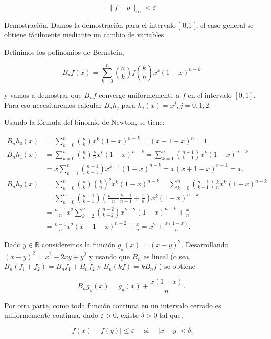 \documentclass[10pt]{book}
\begin{document}
$$
\|f-p\|_{\infty}<\varepsilon
$$

Demostración. Damos la demostración para el intervalo [ 0,1 ], el caso general se obtiene fácilmente mediante un cambio de variables.

Definimos los polinomios de Bernstein,

$$
B_{n} f(x)=\sum_{k=0}^{n}\binom{n}{k} f\left(\frac{k}{n}\right) x^{k}(1-x)^{n-k}
$$

y vamos a demostrar que $B_{n} f$ converge uniformemente a $f$ en el intervalo $[0,1]$. Para eso necesitaremos calcular $B_{n} h_{j}$ para $h_{j}(x)=x^{j}, j=0,1,2$.

Usando la fórmula del binomio de Newton, se tiene:

$$
\begin{aligned}
B_{n} h_{0}(x) & =\sum_{k=0}^{n}\binom{n}{k} x^{k}(1-x)^{n-k}=(x+1-x)^{n}=1 . \\
B_{n} h_{1}(x) & =\sum_{k=0}^{n}\binom{n}{k} \frac{k}{n} x^{k}(1-x)^{n-k}=\sum_{k=1}^{n}\binom{n-1}{k-1} x^{k}(1-x)^{n-k} \\
& =x \sum_{k=1}^{n}\binom{n-1}{k-1} x^{k-1}(1-x)^{n-k}=x(x+1-x)^{n-1}=x . \\
B_{n} h_{2}(x) & =\sum_{k=0}^{n}\binom{n}{k}\left(\frac{k}{n}\right)^{2} x^{k}(1-x)^{n-k}=\sum_{k=0}^{n}\binom{n-1}{k-1} \frac{k}{n} x^{k}(1-x)^{n-k} \\
& =\sum_{k=0}^{n}\binom{n-1}{k-1}\left(\frac{n-1}{n} \frac{k-1}{n-1}+\frac{1}{n}\right) x^{k}(1-x)^{n-k} \\
& =\frac{n-1}{n} x^{2} \sum_{k=2}^{n}\binom{n-2}{k-2} x^{k-2}(1-x)^{n-k}+\frac{x}{n} \\
& =\frac{n-1}{n} x^{2}(x+1-x)^{n-2}+\frac{x}{n}=x^{2}+\frac{x(1-x)}{n} .
\end{aligned}
$$

Dado $y \in \mathbb{R}$ consideremos la función $g_{y}(x)=(x-y)^{2}$. Desarrollando $(x-y)^{2}=x^{2}-2 x y+y^{2}$ y usando que $B_{n}$ es lineal (o sea, $B_{n}\left(f_{1}+f_{2}\right)=B_{n} f_{1}+B_{n} f_{2}$ y $B_{n}(k f)=k B_{n} f$ ) se obtiene


\begin{equation*}
B_{n} g_{y}(x)=g_{y}(x)+\frac{x(1-x)}{n} . \tag{6.1}
\end{equation*}


Por otra parte, como toda función continua en un intervalo cerrado es uniformemente continua, dado $\varepsilon>0$, existe $\delta>0$ tal que,

$$
|f(x)-f(y)| \leq \varepsilon \quad \text { si } \quad|x-y|<\delta .
$$
\end{document}
